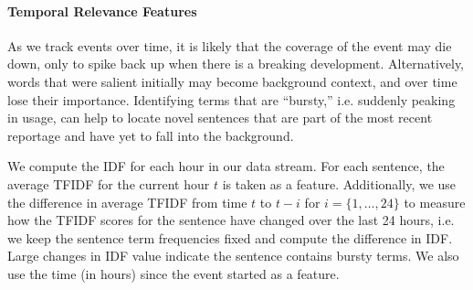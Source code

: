 \paragraph{Temporal Relevance Features}
As we track events over time, it is likely that the coverage of the event 
may die down, only to spike back up when there is a breaking development.
Alternatively, words that were salient initially may become background context,
and over time lose their importance.
Identifying terms that are ``bursty,'' i.e. suddenly peaking in usage,
can help to locate novel sentences that are part of the most recent reportage
and have yet to fall into the background.

We compute the IDF for each hour in our data stream. 
For each sentence, the average TFIDF for the current hour $t$ is taken as a 
feature. Additionally, we use the difference in average TFIDF from time $t$
to $t-i$ for $i = \{1, \ldots, 24\}$ to measure how the TFIDF scores for the 
sentence have changed over the last 24 hours, i.e. we keep the sentence
term frequencies fixed and compute the difference in IDF. Large changes
in IDF value indicate the sentence contains bursty terms.
We also use the time (in hours) since the event started as a feature.





